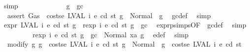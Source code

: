 \begin{isabellebody}
\ simp\isanewline
\ \ \ \ \isamarkupfalse%
\isanewline
\ \ \ \ \ \ \isamarkupfalse%
\ {\isachardoublequoteopen}{\isasymnot}\ g\ {\isasymle}\ gc{\isachardoublequoteclose}\isanewline
\ \ \ \ \ \ \isamarkupfalse%
\ \isamarkupfalse%
\ {\isacharasterisk}{\kern0pt}{\isacharcolon}{\kern0pt}\ {\isachardoublequoteopen}assert\ Gas\ {\isacharparenleft}{\kern0pt}{\isacharparenleft}{\kern0pt}{\isacharless}{\kern0pt}{\isacharparenright}{\kern0pt}\ {\isacharparenleft}{\kern0pt}costs\isactrlsub e\ {\isacharparenleft}{\kern0pt}LVAL\ i{\isacharparenright}{\kern0pt}\ e\ cd\ st{\isacharparenright}{\kern0pt}{\isacharparenright}{\kern0pt}\ g\ {\isacharequal}{\kern0pt}\ Normal\ {\isacharparenleft}{\kern0pt}{\isacharparenleft}{\kern0pt}{\isacharparenright}{\kern0pt}{\isacharcomma}{\kern0pt}\ g{\isacharparenright}{\kern0pt}{\isachardoublequoteclose}\ \isamarkupfalse%
\ gc{\isacharunderscore}{\kern0pt}def\ \isamarkupfalse%
\ simp\isanewline
\ \ \ \ \ \ \isamarkupfalse%
\ \isamarkupfalse%
\ {\isachardoublequoteopen}expr\ {\isacharparenleft}{\kern0pt}LVAL\ i{\isacharparenright}{\kern0pt}\ e\ cd\ st\ g\ {\isacharequal}{\kern0pt}\ rexp\ i\ e\ cd\ st\ {\isacharparenleft}{\kern0pt}g\ {\isacharminus}{\kern0pt}\ gc{\isacharparenright}{\kern0pt}{\isachardoublequoteclose}\ \isamarkupfalse%
\ expr{\isachardot}{\kern0pt}psimps{\isacharparenleft}{\kern0pt}{}{}{\isacharparenright}{\kern0pt}{\isacharbrackleft}{\kern0pt}OF\ {}{}{\isacharparenleft}{\kern0pt}{}{\isacharparenright}{\kern0pt}{\isacharbrackright}{\kern0pt}\ gc{\isacharunderscore}{\kern0pt}def\ \isamarkupfalse%
\ simp\isanewline
\ \ \ \ \ \ \isamarkupfalse%
\ \isamarkupfalse%
\ {\isachardoublequoteopen}rexp\ i\ e\ cd\ st\ {\isacharparenleft}{\kern0pt}g\ {\isacharminus}{\kern0pt}\ gc{\isacharparenright}{\kern0pt}\ {\isacharequal}{\kern0pt}\ Normal\ {\isacharparenleft}{\kern0pt}xa{\isacharcomma}{\kern0pt}\ g{}{\isacharparenright}{\kern0pt}{\isachardoublequoteclose}\ \isamarkupfalse%
\ e{\isacharunderscore}{\kern0pt}def\ \isamarkupfalse%
\ simp\isanewline
\ \ \ \ \ \ \isamarkupfalse%
\ \isamarkupfalse%
\ {\isacharasterisk}{\kern0pt}{\isacharasterisk}{\kern0pt}{\isacharcolon}{\kern0pt}\ {\isachardoublequoteopen}modify\ {\isacharparenleft}{\kern0pt}{\isasymlambda}g{\isachardot}{\kern0pt}\ g\ {\isacharminus}{\kern0pt}\ costs\isactrlsub e\ {\isacharparenleft}{\kern0pt}LVAL\ i{\isacharparenright}{\kern0pt}\ e\ cd\ st{\isacharparenright}{\kern0pt}\ g\ {\isacharequal}{\kern0pt}\ Normal\ {\isacharparenleft}{\kern0pt}{\isacharparenleft}{\kern0pt}{\isacharparenright}{\kern0pt}{\isacharcomma}{\kern0pt}\ g\ {\isacharminus}{\kern0pt}\ costs\isactrlsub e\ {\isacharparenleft}{\kern0pt}LVAL\ i{\isacharparenright}{\kern0pt}\ e\ cd\ st{\isacharparenright}{\kern0pt}{\isachardoublequoteclose}\ \isamarkupfalse%

\end{isabellebody}
